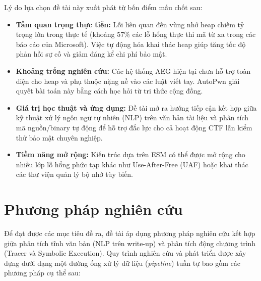 \documentclass[final]{hcmuitthesis}
\begin{document}
Lý do lựa chọn đề tài này xuất phát từ bốn điểm mấu chốt sau:
\begin{itemize}
    \item \textbf{Tầm quan trọng thực tiễn:} Lỗi liên quan đến vùng nhớ heap chiếm tỷ trọng lớn trong thực tế (khoảng 57\% các lỗ hổng thực thi mã từ xa trong các báo cáo của Microsoft). Việc tự động hóa khai thác heap giúp tăng tốc độ phản hồi sự cố và giảm đáng kể chi phí bảo mật.
    \item \textbf{Khoảng trống nghiên cứu:} Các hệ thống AEG hiện tại chưa hỗ trợ toàn diện cho heap và phụ thuộc nặng nề vào các luật viết tay. AutoPwn giải quyết bài toán này bằng cách học hỏi từ tri thức cộng đồng.
    \item \textbf{Giá trị học thuật và ứng dụng:} Đề tài mở ra hướng tiếp cận kết hợp giữa kỹ thuật xử lý ngôn ngữ tự nhiên (NLP) trên văn bản tài liệu và phân tích mã nguồn/binary tự động để hỗ trợ đắc lực cho cả hoạt động CTF lẫn kiểm thử bảo mật chuyên nghiệp.
    \item \textbf{Tiềm năng mở rộng:} Kiến trúc dựa trên ESM có thể được mở rộng cho nhiều lớp lỗ hổng phức tạp khác như Use-After-Free (UAF) hoặc khai thác các thư viện quản lý bộ nhớ tùy biến.
\end{itemize}

\section{Phương pháp nghiên cứu}
Để đạt được các mục tiêu đề ra, đề tài áp dụng phương pháp nghiên cứu kết hợp giữa phân tích tĩnh văn bản (NLP trên write-up) và phân tích động chương trình (Tracer và Symbolic Execution). Quy trình nghiên cứu và phát triển được xây dựng dưới dạng một đường ống xử lý dữ liệu (\textit{pipeline}) tuần tự bao gồm các phương pháp cụ thể sau:
\end{document}
